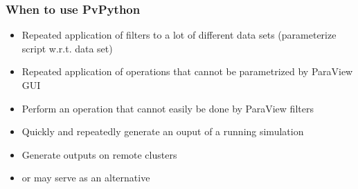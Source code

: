 \begin{frame}

  \frametitle{When to use PvPython}

  \begin{itemize}

    \item Repeated application of filters to a lot of different data sets (parameterize script w.r.t. data set) 

    \item Repeated application of operations that cannot be parametrized by ParaView GUI

    \item Perform an operation that cannot easily be done by ParaView filters 

    \item Quickly and repeatedly generate an ouput of a running simulation 

    \item Generate outputs on remote clusters 

    \item {} or  may serve as an alternative 

  \end{itemize}

\end{frame}

